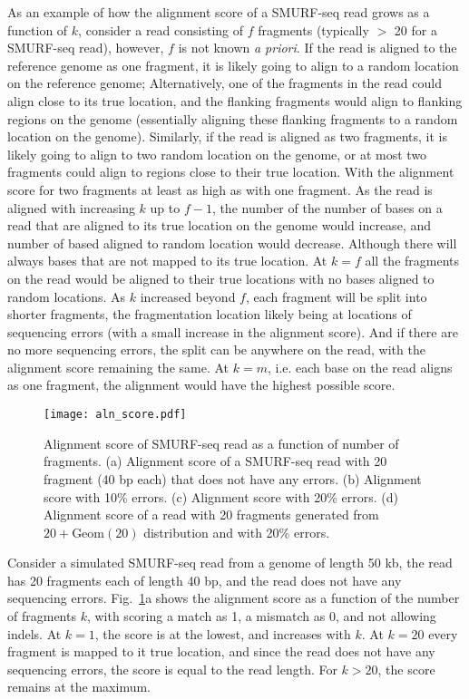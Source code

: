 As an example of how the alignment score of a SMURF-seq read grows as a
function of $k$, consider a read consisting of $f$ fragments (typically
$>$ 20 for a SMURF-seq read), however, $f$ is not known \emph{a priori}.
If the read is aligned to the reference genome as one fragment, it is
likely going to align to a random location on the reference genome;
Alternatively, one of the fragments in the read could align close to its
true location, and the flanking fragments would align to flanking
regions on the genome (essentially aligning these flanking fragments to
a random location on the genome).
Similarly, if the read is aligned as two fragments, it is likely going
to align to two random location on the genome, or at most two fragments
could align to regions close to their true location. With the alignment
score for two fragments at least as high as with one fragment.
As the read is aligned with increasing $k$ up to $f-1$, the number of
the number of bases on a read that are aligned to its true location on
the genome would increase, and number of based aligned to random location
would decrease. Although there will always bases that are not mapped to
its true location.
At $k=f$ all the fragments on the read would be aligned to their true
locations with no bases aligned to random locations.
As $k$ increased beyond $f$, each fragment will be split into shorter
fragments, the fragmentation location likely being at locations of
sequencing errors (with a small increase in the alignment score). And if
there are no more sequencing errors, the split can be anywhere on the
read, with the alignment score remaining the same.
At $k=m$, i.e. each base on the read aligns as one fragment, the
alignment would have the highest possible score.

\begin{figure}[t!]
\centering
\texttt{[image: aln\_score.pdf]}
\caption[Alignment score of SMURF-seq read as a function of number of
  fragments]{
  Alignment score of SMURF-seq read as a function of number of
  fragments.
  (a) Alignment score of a SMURF-seq read with 20 fragment (40 bp each)
  that does not have any errors.
  (b) Alignment score with 10\% errors.
  (c) Alignment score with 20\% errors.
  (d) Alignment score of a read with 20 fragments generated from $20 +
  \text{Geom}(20)$ distribution and with 20\% errors.}
\label{aln_score}
\end{figure}

Consider a simulated SMURF-seq read from a genome of length 50 kb, the
read has 20 fragments each of length 40 bp, and the read does not have
any sequencing errors. Fig.~\ref{aln_score}a shows the alignment score
as a function of the number of fragments $k$, with scoring a match as
1, a mismatch as 0, and not allowing indels. At $k=1$, the score is at
the lowest, and increases with $k$. At $k=20$ every fragment is mapped
to it true location, and since the read does not have any sequencing
errors, the score is equal to the read length. For $k > 20$, the score
remains at the maximum.

